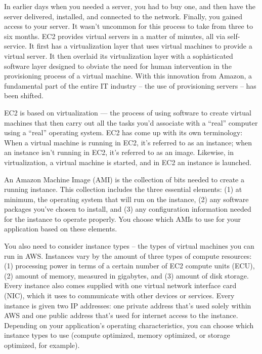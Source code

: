 \documentclass[]{book}
\begin{document}
In earlier days when you needed a server, you had to buy one, and then have the server delivered, installed, and connected to the network. Finally, you gained access to your server. It wasn't uncommon for this process to take from three to six months. EC2 provides virtual servers in a matter of minutes, all via self-service. It first has a virtualization layer that uses virtual machines to provide a virtual server. It then overlaid its virtualization layer with a sophisticated software layer designed to obviate the need for human intervention in the provisioning process of a virtual machine. With this innovation from Amazon, a fundamental part of the entire IT industry -- the use of provisioning servers -- has been shifted.

EC2 is based on virtualization --- the process of using software to create virtual machines that then carry out all the tasks you'd associate with a ``real'' computer using a ``real'' operating system. EC2 has come up with its own terminology: When a virtual machine is running in EC2, it's referred to as an instance; when an instance isn't running in EC2, it's referred to as an image. Likewise, in virtualization, a virtual machine is started, and in EC2 an instance is launched.

An Amazon Machine Image (AMI) is the collection of bits needed to create a running instance. This collection includes the three essential elements: (1) at minimum, the operating system that will run on the instance, (2) any software packages you've chosen to install, and (3) any configuration information needed for the instance to operate properly. You choose which AMIs to use for your application based on these elements.

You also need to consider instance types -- the types of virtual machines you can run in AWS. Instances vary by the amount of three types of compute resources: (1) processing power in terms of a certain number of EC2 compute units (ECU), (2) amount of memory, measured in gigabytes, and (3) amount of disk storage. Every instance also comes supplied with one virtual network interface card (NIC), which it uses to communicate with other devices or services. Every instance is given two IP addresses: one private address that's used solely within AWS and one public address that's used for internet access to the instance. Depending on your application's operating characteristics, you can choose which instance types to use (compute optimized, memory optimized, or storage optimized, for example).
\end{document}

